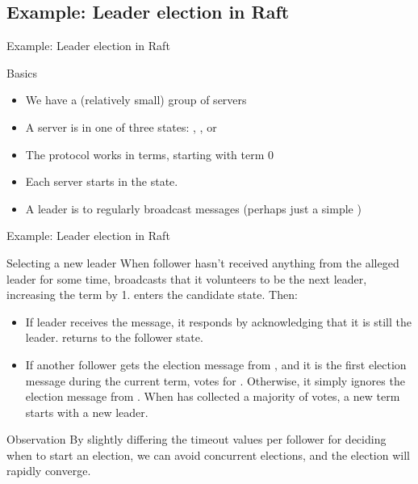\subsection{Example: Leader election in Raft}
\begin{frame}{Example: Leader election in Raft}
  \begin{block}{Basics}
    \begin{itemize}\firmlist
      \item We have a (relatively small) group of servers
      \item A server is in one of three states: , , or 
      \item The protocol works in terms, starting with term 0
      \item Each server starts in the  state.
      \item A leader is to regularly broadcast messages (perhaps just a simple )
    \end{itemize}
  \end{block}
\end{frame}
\begin{frame}{Example: Leader election in Raft}
  \begin{block}{Selecting a new leader}
    When follower  hasn't received anything from the alleged leader  for some time, 
    broadcasts that it volunteers to be the next leader, increasing the term by 1.  enters the
    candidate state. Then:
    \begin{itemize}\firmlist
      \item If leader  receives the message, it responds by acknowledging that it is still the
            leader.  returns to the follower state.
      \item If another follower  gets the election message from , and it is the first
            election message during the current term,  votes for . Otherwise, it simply ignores
            the election message from . When  has collected a majority of votes, a new term starts
            with a new leader.
    \end{itemize}
  \end{block}

  \begin{alertblock}{Observation}
    By slightly differing the timeout values per follower for deciding when to start an election, we can avoid
    concurrent elections, and the election will rapidly converge.
  \end{alertblock}

\end{frame}
